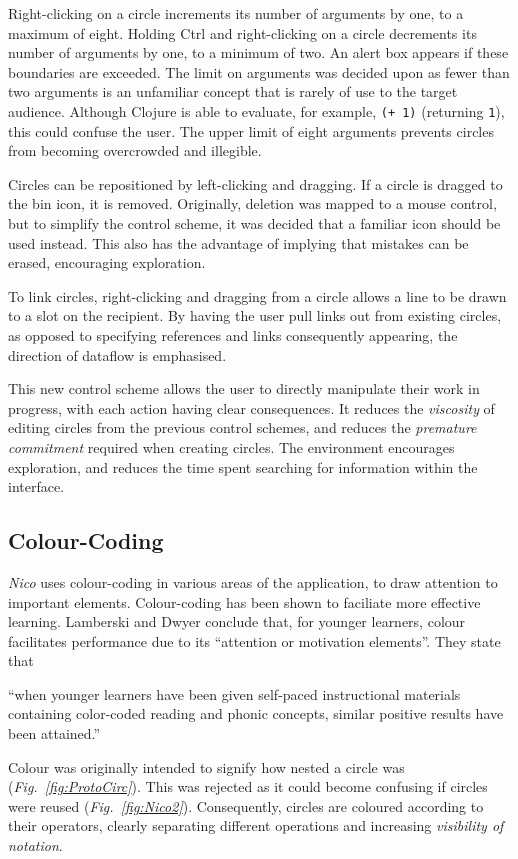 \documentclass[12pt,twoside,notitlepage,xetex]{report}
\begin{document}
Right-clicking on a circle increments its number of arguments by one, to a maximum of eight.  Holding Ctrl and right-clicking on a circle decrements its number of arguments by one, to a minimum of two.  An alert box appears if these boundaries are exceeded.  The limit on arguments was decided upon as fewer than two arguments is an unfamiliar concept that is rarely of use to the target audience.  Although Clojure is able to evaluate, for example, \verb¬(+ 1)¬ (returning \verb¬1¬), this could confuse the user.  The upper limit of eight arguments prevents circles from becoming overcrowded and illegible.

Circles can be repositioned by left-clicking and dragging.  If a circle is dragged to the bin icon, it is removed.  Originally, deletion was mapped to a mouse control, but to simplify the control scheme, it was decided that a familiar icon should be used instead.  This also has the advantage of implying that mistakes can be erased, encouraging exploration.

To link circles, right-clicking and dragging from a circle allows a line to be drawn to a slot on the recipient.  By having the user pull links out from existing circles, as opposed to specifying references and links consequently appearing, the direction of dataflow is emphasised.

This new control scheme allows the user to directly manipulate their work in progress, with each action having clear consequences.  It reduces the \emph{viscosity} of editing circles from the previous control schemes, and reduces the \emph{premature commitment} required when creating circles.  The environment encourages exploration, and reduces the time spent searching for information within the interface.

\subsection{Colour-Coding}

\emph{Nico} uses colour-coding in various areas of the application, to draw attention to important elements.  Colour-coding has been shown to faciliate more effective learning.  Lamberski and Dwyer conclude that, for younger learners, colour facilitates performance due to its ``attention or motivation elements''.  They state that
\begin{center}
\parbox[c]{\textwidth-2cm}{
\small
``when younger learners have been given self-paced instructional materials containing color-coded reading and phonic concepts, similar positive results have been attained.'' \cite{Lamberski1983}
}
\end{center}
Colour was originally intended to signify how nested a circle was (\emph{Fig.~\ref{fig:ProtoCirc}}).  This was rejected as it could become confusing if circles were reused (\emph{Fig.~\ref{fig:Nico2}}).  Consequently, circles are coloured according to their operators, clearly separating different operations and increasing \emph{visibility of notation}.
\end{document}
